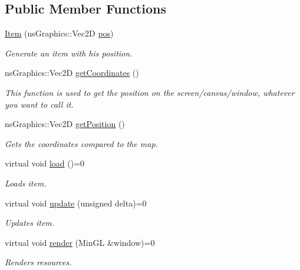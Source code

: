 \subsection*{Public Member Functions}
\begin{DoxyCompactItemize}
\item 
\hyperlink{structns_game_1_1_item_a7b70bf14fdd5c660ac1181f86482685b}{Item} (ns\+Graphics\+::\+Vec2D \hyperlink{structns_game_1_1_item_a5518876a13f3d2eda659d29748097f1a}{pos})
\begin{DoxyCompactList}\small\item\em Generate an item with his position. \end{DoxyCompactList}\item 
ns\+Graphics\+::\+Vec2D \hyperlink{structns_game_1_1_item_a52af52633c8924e35b47347f8c51a22e}{get\+Coordinates} ()
\begin{DoxyCompactList}\small\item\em This function is used to get the position on the screen/canvas/window, whatever you want to call it. \end{DoxyCompactList}\item 
ns\+Graphics\+::\+Vec2D \hyperlink{structns_game_1_1_item_abd124b5001b8dc63b8513e5b85c6c2b9}{get\+Position} ()
\begin{DoxyCompactList}\small\item\em Gets the coordinates compared to the map. \end{DoxyCompactList}\item 
virtual void \hyperlink{structns_game_1_1_item_a5887b6e9225ae8a276801225eca83808}{load} ()=0
\begin{DoxyCompactList}\small\item\em Loads item. \end{DoxyCompactList}\item 
virtual void \hyperlink{structns_game_1_1_item_a96c07d0f91eef0d77e91d1a7397091a1}{update} (unsigned delta)=0
\begin{DoxyCompactList}\small\item\em Updates item. \end{DoxyCompactList}\item 
virtual void \hyperlink{structns_game_1_1_item_a451b6491efc475c9ca47dcccdbbde707}{render} (Min\+GL \&window)=0
\begin{DoxyCompactList}\small\item\em Renders resources. \end{DoxyCompactList}\item 

\end{DoxyCompactItemize}
